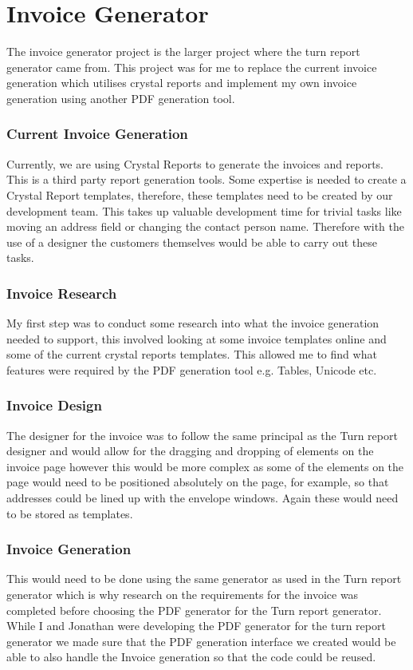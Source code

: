 \section{Invoice Generator}{
	The invoice generator project is the larger project where the turn report generator came from. This project was for me to replace the current invoice generation which utilises crystal reports and implement my own invoice generation using another PDF generation tool.
	\subsubsection*{Current Invoice Generation}{
		Currently, we are using Crystal Reports to generate the invoices and reports. This is a third party report generation tools. Some expertise is needed to create a Crystal Report templates, therefore, these templates need to be created by our development team. This takes up valuable development time for trivial tasks like moving an address field or changing the contact person name. Therefore with the use of a designer the customers themselves would be able to carry out these tasks.
	}
	\subsubsection*{Invoice Research}{
		My first step was to conduct some research into what the invoice generation needed to support, this involved looking at some invoice templates online and some of the current crystal reports templates. This allowed me to find what features were required by the PDF generation tool e.g. Tables, Unicode etc.
	}
	\subsubsection*{Invoice Design}{
		The designer for the invoice was to follow the same principal as the Turn report designer and would allow for the dragging and dropping of elements on the invoice page however this would be more complex as some of the elements on the page would need to be positioned absolutely on the page, for example, so that addresses could be lined up with the envelope windows. Again these would need to be stored as templates. 
	}
	\subsubsection*{Invoice Generation}{
		This would need to be done using the same generator as used in the Turn report generator which is why research on the requirements for the invoice was completed before choosing the PDF generator for the Turn report generator. While I and Jonathan were developing the PDF generator for the turn report generator we made sure that the PDF generation interface we created would be able to also handle the Invoice generation so that the code could be reused.
	}
}